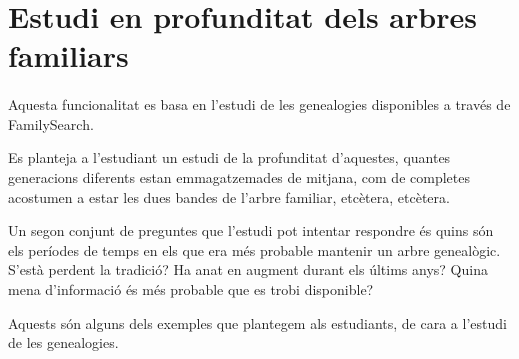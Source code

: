 \section{Estudi en profunditat dels arbres familiars}

    \paragraph{}
    Aquesta funcionalitat es basa en l'estudi de les genealogies disponibles a través de FamilySearch.

    Es planteja a l'estudiant un estudi de la profunditat d'aquestes, quantes generacions diferents estan emmagatzemades de mitjana, com de completes acostumen a estar les dues bandes de l'arbre familiar, etcètera, etcètera.

    Un segon conjunt de preguntes que l'estudi pot intentar respondre és quins són els períodes de temps en els que era més probable mantenir un arbre genealògic. S'està perdent la tradició? Ha anat en augment durant els últims anys? Quina mena d'informació és més probable que es trobi disponible?

    Aquests són alguns dels exemples que plantegem als estudiants, de cara a l'estudi de les genealogies.
